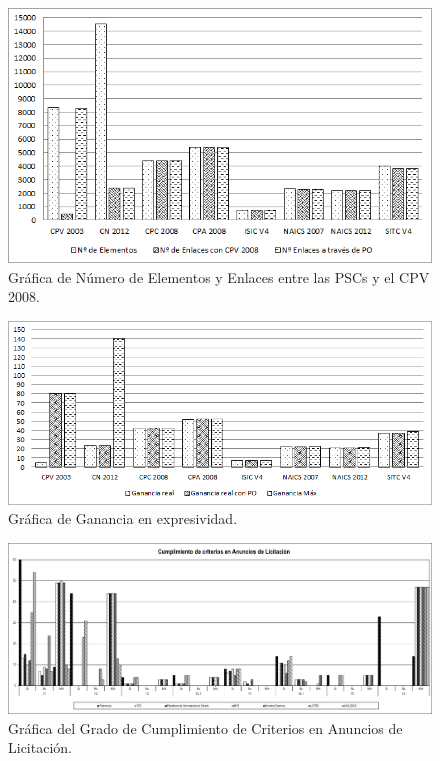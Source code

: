 \begin{figure}[!htb]
\centering
	\includegraphics[width=14cm]{./images/phd/experimentation/pscs-enlaces}
\caption{Gráfica de Número de Elementos y Enlaces entre las PSCs y el CPV 2008.}
\label{fig:pscs-enlaces}
\end{figure}

\begin{figure}[!htb]
\centering
	\includegraphics[width=14cm]{./images/phd/experimentation/pscs-ganancia}
\caption{Gráfica de Ganancia en expresividad.}
\label{fig:pscs-ganancia}
\end{figure}

\begin{figure}[!htb]
\centering
	\includegraphics[width=16cm]{./images/phd/experimentation/criterios-ppn}
\caption{Gráfica del Grado de Cumplimiento de Criterios en Anuncios de Licitación.}
\label{fig:eval-criteria-ppn}
\end{figure}



